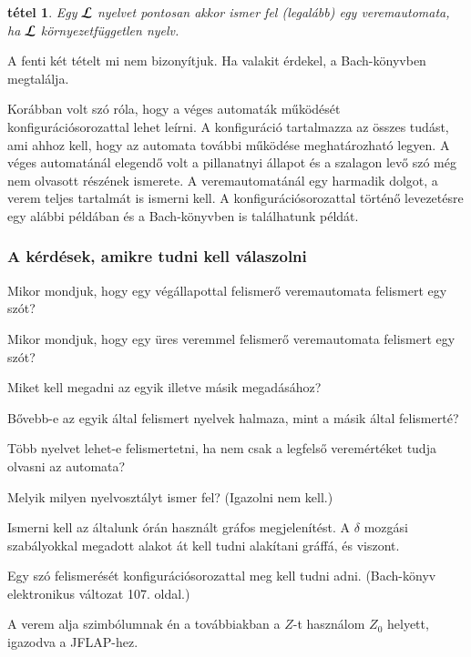 \documentclass[a4paper]{article}
\newtheorem{tetel}{tétel}[section]
\begin{document}
\begin{tetel}
    Egy $\cal L$ nyelvet pontosan akkor ismer fel (legalább) egy
    veremautomata, ha $\cal L$ környezetfüggetlen nyelv.
\end{tetel}

A fenti két tételt mi nem bizonyítjuk. Ha valakit érdekel, a
Bach-könyvben megtalálja.

Korábban volt szó róla, hogy a véges automaták működését
konfigurációsorozattal lehet leírni. A konfiguráció tartalmazza az
összes tudást, ami ahhoz kell, hogy az automata további működése
meghatározható legyen.  A véges automatánál elegendő volt a pillanatnyi
állapot és a szalagon levő szó még nem olvasott részének ismerete. A
veremautomatánál egy harmadik dolgot, a verem teljes tartalmát is
ismerni kell. A konfigurációsorozattal történő levezetésre egy alábbi
példában és a Bach-könyvben is találhatunk példát.

\subsubsection{A kérdések, amikre tudni kell válaszolni}

Mikor mondjuk, hogy egy végállapottal felismerő veremautomata
felismert egy szót?

Mikor mondjuk, hogy egy üres veremmel felismerő veremautomata
felismert egy szót?

Miket kell megadni az egyik illetve másik megadásához?

Bővebb-e az egyik által felismert nyelvek halmaza, mint a másik által
felismerté?

Több nyelvet lehet-e felismertetni, ha nem csak a legfelső veremértéket
tudja olvasni az automata?

Melyik milyen nyelvosztályt ismer fel? (Igazolni nem kell.)


Ismerni kell az általunk órán használt gráfos megjelenítést.
A $\delta$ mozgási szabályokkal megadott alakot át kell tudni
alakítani gráffá, és viszont.

Egy szó felismerését konfigurációsorozattal meg kell tudni adni.
(Bach-könyv elektronikus változat 107. oldal.)

A verem alja szimbólumnak én a továbbiakban a $Z$-t használom $Z_0$ helyett,
igazodva a JFLAP-hez.
\end{document}
